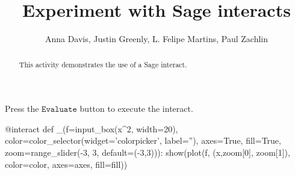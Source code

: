 \documentclass{ximera}
\title{Experiment with Sage interacts}
\author{Anna Davis, Justin Greenly, L. Felipe Martins, Paul Zachlin}
\begin{document}
\begin{abstract}
This activity demonstrates the use of a Sage interact.

\end{abstract}

\maketitle

Press the $\mathtt{Evaluate}$ button to execute the interact.

\begin{sageCell}
@interact
def _(f=input_box(x^2, width=20),
      color=color_selector(widget='colorpicker', label=''),
      axes=True,
      fill=True,
      zoom=range_slider(-3, 3, default=(-3,3))):
    show(plot(f, (x,zoom[0], zoom[1]), color=color, axes=axes, fill=fill))
\end{sageCell}
\end{document}
